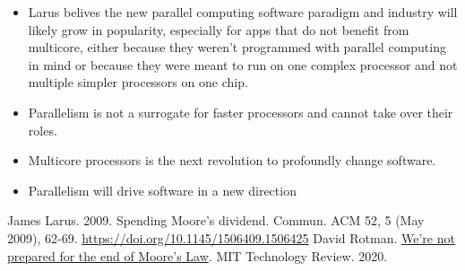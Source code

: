 \documentclass [12pt]{article}
\begin{document}
\begin{itemize}
            \item Larus belives the new parallel computing software paradigm and industry will likely grow in popularity, especially for apps that do not benefit from multicore, either because they weren't programmed with parallel computing in mind or because they were meant to run on one complex processor and not multiple simpler processors on one chip. 
            \item Parallelism is not a surrogate for faster processors and cannot take over their roles. 
            \item Multicore processors is the next revolution to profoundly change software. 
            \item Parallelism will drive software in a new direction 
        \end{itemize}

 
        



\begin{thebibliography}{1}
    James Larus. 2009. Spending Moore's dividend. Commun. ACM 52, 5 (May 2009), 62-69. \url{https://doi.org/10.1145/1506409.1506425}
    David Rotman. \href{https://www.technologyreview.com/2020/02/24/905789/were-not-prepared-for-the-end-of-moores-law/}{We're not prepared for the end of Moore's Law}. MIT Technology Review. 2020. 
\end{thebibliography}
\end{document}
